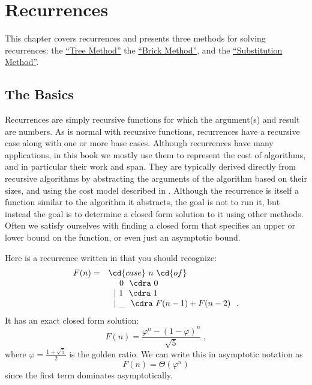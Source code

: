 \chapter{Recurrences}
\label{ch:analysis::recurrences}


\begin{preamble}
This chapter covers recurrences  and presents
three methods for solving recurrences: 
%
the \href{sec:analysis::recurrences::tree-method}{``Tree Method''}
%
the \href{sec:analysis::recurrences::brick-method}{``Brick Method''}, and
%
the \href{sec:analysis::recurrences::master-method}{``Substitution Method''}.
\end{preamble}

\section{The Basics}

\begin{gram}
  Recurrences are simply recursive functions for which the argument(s) and
  result are numbers. %
%
  As is normal with recursive functions, recurrences have a recursive
  case along with one or more base cases.
%
  Although recurrences have many applications, in this book we mostly use
  them to represent the cost of algorithms, and in particular their
  work and span.
%
  They are typically derived directly from recursive algorithms by
  abstracting the arguments of the algorithm based on their sizes, and
  using the cost model described in .
%
  Although the recurrence is itself a function similar to the
  algorithm it abstracts, the goal is not to run it, but instead the
  goal is to determine a closed form solution to it using other
  methods.
%
  Often we satisfy ourselves with finding a closed form that specifies an
  upper or lower bound on the function, or even just an asymptotic
  bound.
\end{gram}

\begin{example}[Fibonacci]
Here is a recurrence written in \PML{} that you should recognize:
\[
\begin{array}{ll}
F(n) =&\cd{case}~n~\cd{of}
\\ 
& ~~~~0~~\cdra~0
\\
& ~~|~1~~\cdra~1
\\
& ~~|~\_~~\cdra~F(n-1) + F(n-2)~~.
\end{array}
\]
%
It has an exact closed form solution:
%
 \[F(n) = \frac{\varphi^n - (1 - \varphi)^n}{\sqrt{5}}~,\]
%
where $\varphi = \frac{1 + \sqrt{5}}{2}$ is the golden ratio.
We can write this in asymptotic notation as \[F(n) =
\Theta(\varphi^n) \]
since the first term dominates asymptotically.
\end{example}

